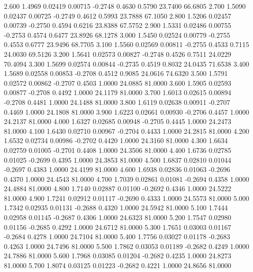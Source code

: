    2.600   1.4969   0.02419   0.00715  -0.2748   0.4630   0.5790  23.7400  66.6805
   2.700   1.5090   0.02437   0.00725  -0.2749   0.4612   0.5993  23.7888  67.1050
   2.800   1.5206   0.02457   0.00739  -0.2750   0.4594   0.6216  23.8388  67.5752
   2.900   1.5331   0.02486   0.00755  -0.2753   0.4574   0.6477  23.8926  68.1278
   3.000   1.5450   0.02524   0.00779  -0.2755   0.4553   0.6777  23.9496  68.7705
   3.100   1.5560   0.02569   0.00811  -0.2755   0.4533   0.7115  24.0030  69.5126
   3.200   1.5641   0.02573   0.00827  -0.2748   0.4526   0.7511  24.0229  70.4094
   3.300   1.5699   0.02574   0.00844  -0.2735   0.4519   0.8032  24.0435  71.6538
   3.400   1.5689   0.02558   0.00853  -0.2708   0.4512   0.9085  24.0616  74.6320
   3.500   1.5791   0.02572   0.00862  -0.2707   0.4503   1.0000  24.0885  81.0000
   3.600   1.5905   0.02593   0.00877  -0.2708   0.4492   1.0000  24.1179  81.0000
   3.700   1.6013   0.02615   0.00894  -0.2708   0.4481   1.0000  24.1488  81.0000
   3.800   1.6119   0.02638   0.00911  -0.2707   0.4469   1.0000  24.1808  81.0000
   3.900   1.6223   0.02661   0.00930  -0.2706   0.4457   1.0000  24.2137  81.0000
   4.000   1.6327   0.02685   0.00948  -0.2705   0.4445   1.0000  24.2473  81.0000
   4.100   1.6430   0.02710   0.00967  -0.2704   0.4433   1.0000  24.2815  81.0000
   4.200   1.6532   0.02734   0.00986  -0.2702   0.4420   1.0000  24.3160  81.0000
   4.300   1.6634   0.02759   0.01005  -0.2701   0.4408   1.0000  24.3506  81.0000
   4.400   1.6736   0.02785   0.01025  -0.2699   0.4395   1.0000  24.3853  81.0000
   4.500   1.6837   0.02810   0.01044  -0.2697   0.4383   1.0000  24.4199  81.0000
   4.600   1.6938   0.02836   0.01063  -0.2696   0.4370   1.0000  24.4543  81.0000
   4.700   1.7039   0.02861   0.01081  -0.2694   0.4358   1.0000  24.4884  81.0000
   4.800   1.7140   0.02887   0.01100  -0.2692   0.4346   1.0000  24.5222  81.0000
   4.900   1.7241   0.02912   0.01117  -0.2690   0.4333   1.0000  24.5573  81.0000
   5.000   1.7342   0.02935   0.01131  -0.2688   0.4320   1.0000  24.5942  81.0000
   5.100   1.7444   0.02958   0.01145  -0.2687   0.4306   1.0000  24.6323  81.0000
   5.200   1.7547   0.02980   0.01156  -0.2685   0.4292   1.0000  24.6712  81.0000
   5.300   1.7651   0.03003   0.01167  -0.2684   0.4278   1.0000  24.7104  81.0000
   5.400   1.7756   0.03027   0.01178  -0.2683   0.4263   1.0000  24.7496  81.0000
   5.500   1.7862   0.03053   0.01189  -0.2682   0.4249   1.0000  24.7886  81.0000
   5.600   1.7968   0.03085   0.01204  -0.2682   0.4235   1.0000  24.8273  81.0000
   5.700   1.8074   0.03125   0.01223  -0.2682   0.4221   1.0000  24.8656  81.0000
